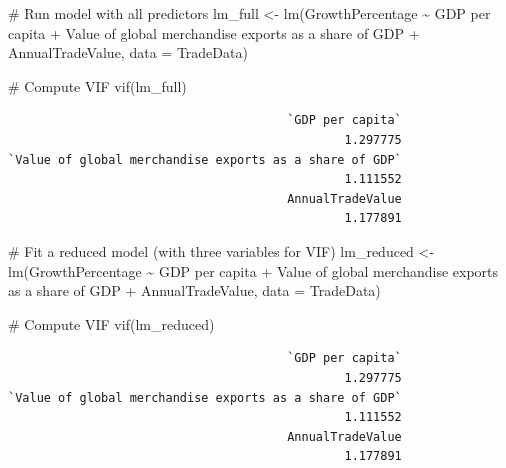 \documentclass[
  10pt,
]{article}
\newenvironment{Shaded}{\begin{snugshade}}{\end{snugshade}}
\newcommand{\AttributeTok}[1]{\textcolor[rgb]{0.40,0.45,0.13}{#1}}
\newcommand{\CommentTok}[1]{\textcolor[rgb]{0.37,0.37,0.37}{#1}}
\newcommand{\FunctionTok}[1]{\textcolor[rgb]{0.28,0.35,0.67}{#1}}
\newcommand{\NormalTok}[1]{\textcolor[rgb]{0.00,0.23,0.31}{#1}}
\newcommand{\OtherTok}[1]{\textcolor[rgb]{0.00,0.23,0.31}{#1}}
\newcommand{\SpecialCharTok}[1]{\textcolor[rgb]{0.37,0.37,0.37}{#1}}
\newcommand{\StringTok}[1]{\textcolor[rgb]{0.13,0.47,0.30}{#1}}
\begin{document}
\begin{Shaded}
\begin{Highlighting}[]
\CommentTok{\# Run model with all predictors}
\NormalTok{lm\_full }\OtherTok{\textless{}{-}} \FunctionTok{lm}\NormalTok{(GrowthPercentage }\SpecialCharTok{\textasciitilde{}} \StringTok{\textasciigrave{}}\AttributeTok{GDP per capita}\StringTok{\textasciigrave{}} \SpecialCharTok{+} \StringTok{\textasciigrave{}}\AttributeTok{Value of global merchandise exports as a share of GDP}\StringTok{\textasciigrave{}} \SpecialCharTok{+}\NormalTok{ AnnualTradeValue, }\AttributeTok{data =}\NormalTok{ TradeData)}

\CommentTok{\# Compute VIF}
\FunctionTok{vif}\NormalTok{(lm\_full)}
\end{Highlighting}
\end{Shaded}

\begin{verbatim}
                                       `GDP per capita` 
                                               1.297775 
`Value of global merchandise exports as a share of GDP` 
                                               1.111552 
                                       AnnualTradeValue 
                                               1.177891 
\end{verbatim}

\begin{Shaded}
\begin{Highlighting}[]
\CommentTok{\# Fit a reduced model (with three variables for VIF)}
\NormalTok{lm\_reduced }\OtherTok{\textless{}{-}} \FunctionTok{lm}\NormalTok{(GrowthPercentage }\SpecialCharTok{\textasciitilde{}} \StringTok{\textasciigrave{}}\AttributeTok{GDP per capita}\StringTok{\textasciigrave{}} \SpecialCharTok{+} \StringTok{\textasciigrave{}}\AttributeTok{Value of global merchandise exports as a share of GDP}\StringTok{\textasciigrave{}} \SpecialCharTok{+}\NormalTok{ AnnualTradeValue, }\AttributeTok{data =}\NormalTok{ TradeData)}

\CommentTok{\# Compute VIF}
\FunctionTok{vif}\NormalTok{(lm\_reduced)}
\end{Highlighting}
\end{Shaded}

\begin{verbatim}
                                       `GDP per capita` 
                                               1.297775 
`Value of global merchandise exports as a share of GDP` 
                                               1.111552 
                                       AnnualTradeValue 
                                               1.177891 
\end{verbatim}
\end{document}
